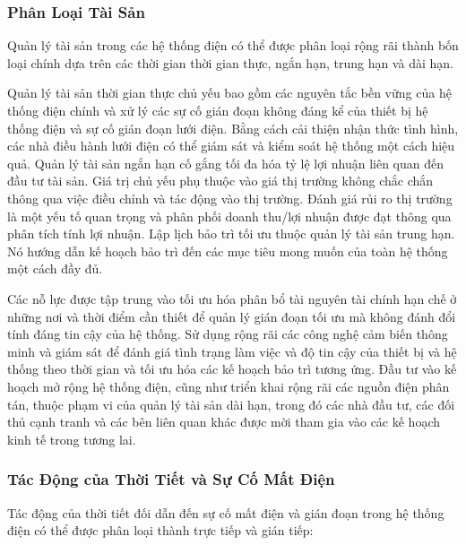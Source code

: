 \documentclass[utf8]{frontiersSCNS} %
\begin{document}

\subsubsection{Phân Loại Tài Sản} 

Quản lý tài sản trong các hệ thống điện có thể được phân loại rộng rãi thành bốn loại chính dựa trên các thời gian thời gian thực, ngắn hạn, trung hạn và dài hạn. 

Quản lý tài sản thời gian thực chủ yếu bao gồm các nguyên tắc bền vững của hệ thống điện chính và xử lý các sự cố gián đoạn không đáng kể của thiết bị hệ thống điện và sự cố gián đoạn lưới điện. Bằng cách cải thiện nhận thức tình hình, các nhà điều hành lưới điện có thể giám sát và kiểm soát hệ thống một cách hiệu quả. Quản lý tài sản ngắn hạn cố gắng tối đa hóa tỷ lệ lợi nhuận liên quan đến đầu tư tài sản. Giá trị chủ yếu phụ thuộc vào giá thị trường không chắc chắn thông qua việc điều chỉnh và tác động vào thị trường. Đánh giá rủi ro thị trường là một yếu tố quan trọng và phân phối doanh thu/lợi nhuận được đạt thông qua phân tích tính lợi nhuận. Lập lịch bảo trì tối ưu thuộc quản lý tài sản trung hạn. Nó hướng dẫn kế hoạch bảo trì đến các mục tiêu mong muốn của toàn hệ thống một cách đầy đủ.

Các nỗ lực được tập trung vào tối ưu hóa phân bổ tài nguyên tài chính hạn chế ở những nơi và thời điểm cần thiết để quản lý gián đoạn tối ưu mà không đánh đổi tính đáng tin cậy của hệ thống. Sử dụng rộng rãi các công nghệ cảm biến thông minh và giám sát để đánh giá tình trạng làm việc và độ tin cậy của thiết bị và hệ thống theo thời gian và tối ưu hóa các kế hoạch bảo trì tương ứng. Đầu tư vào kế hoạch mở rộng hệ thống điện, cũng như triển khai rộng rãi các nguồn điện phân tán, thuộc phạm vi của quản lý tài sản dài hạn, trong đó các nhà đầu tư, các đối thủ cạnh tranh và các bên liên quan khác được mời tham gia vào các kế hoạch kinh tế trong tương lai.


\subsubsection{Tác Động của Thời Tiết và Sự Cố Mất Điện}
Tác động của thời tiết đối dẫn đến sự cố mất điện và gián đoạn trong hệ thống điện có thể được phân loại thành trực tiếp và gián tiếp:
\end{document}
